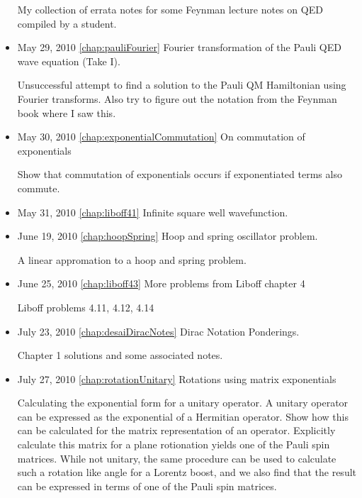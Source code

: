 \begin{itemize}
My collection of errata notes for some Feynman lecture notes on QED compiled by a student.\item May 29, 2010 \ref{chap:pauliFourier} Fourier transformation of the Pauli QED wave equation (Take I).

Unsuccessful attempt to find a solution to the Pauli QM Hamiltonian using Fourier transforms.  Also try to figure out the notation from the Feynman book where I saw this.\item May 30, 2010 \ref{chap:exponentialCommutation} On commutation of exponentials

Show that commutation of exponentials occurs if exponentiated terms also commute.\item May 31, 2010 \ref{chap:liboff41} Infinite square well wavefunction.

\item June 19, 2010 \ref{chap:hoopSpring} Hoop and spring oscillator problem.

A linear appromation to a hoop and spring problem.\item June 25, 2010 \ref{chap:liboff43} More problems from Liboff chapter 4

Liboff problems 4.11, 4.12, 4.14\item July 23, 2010 \ref{chap:desaiDiracNotes} Dirac Notation Ponderings.

Chapter 1 solutions and some associated notes.\item July 27, 2010 \ref{chap:rotationUnitary} Rotations using matrix exponentials

Calculating the exponential form for a unitary operator.  A unitary operator can be expressed as the exponential of a Hermitian operator.  Show how this can be calculated for the matrix representation of an operator.  Explicitly calculate this matrix for a plane rotionation yields one of the Pauli spin matrices.  While not unitary, the same procedure can be used to calculate such a rotation like angle for a Lorentz boost, and we also find that the result can be expressed in terms of one of the Pauli spin matrices.\end{itemize}
